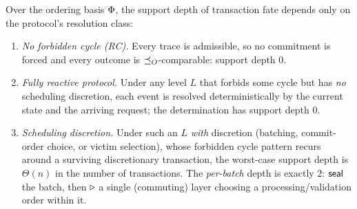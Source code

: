 \begin{theorem}
  \label{thm:txn-depth}
  Over the ordering basis $\Phi$, the support depth of transaction fate
  depends only on the protocol's resolution class:
  \begin{enumerate}[nosep,label=(\alph*)]
    \item \emph{No forbidden cycle (RC).} Every trace is admissible, so no
          commitment is forced and every outcome is $\preceq_O$-comparable:
          support depth $0$.
    \item \emph{Fully reactive protocol.} Under any level $L$ that forbids some
          cycle but has \emph{no} scheduling discretion, each event is resolved
          deterministically by the current state and the arriving request; the
          determination has support depth $0$.
    \item \emph{Scheduling discretion.} Under such an $L$ \emph{with}
          discretion (batching, commit-order choice, or victim selection),
          whose forbidden cycle pattern recurs around a surviving
          discretionary transaction, the worst-case support depth is
          $\Theta(n)$ in the number of transactions. The \emph{per-batch} depth
          is exactly $2$: $\mathsf{seal}$ the batch, then $\mathbin{\triangleright}$ a single
          (commuting) layer choosing a processing/validation order within it.
  \end{enumerate}
\end{theorem}
